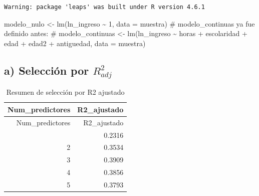 \documentclass[
  spanish,
  letterpaper,
  DIV=11,
  numbers=noendperiod]{scrartcl}
\newenvironment{Shaded}{\begin{snugshade}}{\end{snugshade}}
\newcommand{\AttributeTok}[1]{\textcolor[rgb]{0.40,0.45,0.13}{#1}}
\newcommand{\CommentTok}[1]{\textcolor[rgb]{0.37,0.37,0.37}{#1}}
\newcommand{\DecValTok}[1]{\textcolor[rgb]{0.68,0.00,0.00}{#1}}
\newcommand{\FunctionTok}[1]{\textcolor[rgb]{0.28,0.35,0.67}{#1}}
\newcommand{\NormalTok}[1]{\textcolor[rgb]{0.00,0.23,0.31}{#1}}
\newcommand{\OtherTok}[1]{\textcolor[rgb]{0.00,0.23,0.31}{#1}}
\newcommand{\SpecialCharTok}[1]{\textcolor[rgb]{0.37,0.37,0.37}{#1}}
\newcommand{\StringTok}[1]{\textcolor[rgb]{0.13,0.47,0.30}{#1}}
\begin{document}
\begin{verbatim}
Warning: package 'leaps' was built under R version 4.6.1
\end{verbatim}

\begin{Shaded}
\begin{Highlighting}[]
\NormalTok{modelo\_nulo }\OtherTok{\textless{}{-}} \FunctionTok{lm}\NormalTok{(ln\_ingreso }\SpecialCharTok{\textasciitilde{}} \DecValTok{1}\NormalTok{, }\AttributeTok{data =}\NormalTok{ muestra)}
\CommentTok{\# modelo\_continuas ya fue definido antes:}
\CommentTok{\# modelo\_continuas \textless{}{-} lm(ln\_ingreso \textasciitilde{} horas + escolaridad + edad + edad2 + antiguedad, data = muestra)}
\end{Highlighting}
\end{Shaded}

\subsection{\texorpdfstring{a) Selección por
\(R^2_{adj}\)}{a) Selección por R\^{}2\_\{adj\}}}\label{a-selecciuxf3n-por-r2_adj}

\begin{Shaded}
\end{Shaded}

\begin{longtable}[]{@{}rr@{}}
\caption{Resumen de selección por R2 ajustado}\tabularnewline
\toprule\noalign{}
Num\_predictores & R2\_ajustado \\
\midrule\noalign{}
\endfirsthead
\toprule\noalign{}
Num\_predictores & R2\_ajustado \\
\midrule\noalign{}
\endhead
\bottomrule\noalign{}
\endlastfoot
1 & 0.2316 \\
2 & 0.3534 \\
3 & 0.3909 \\
4 & 0.3856 \\
5 & 0.3793 \\
\end{longtable}
\end{document}
